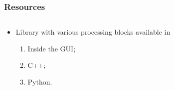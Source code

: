 \begin{frame}
	\frametitle{Resources}
    
\begin{columns}
        \begin{column}{0.5\textwidth}
     \begin{itemize}
    \item Library with various processing blocks available in
    \begin{enumerate}
     \item Inside the GUI;
     \item C++;
     \item Python.
    \end{enumerate}
     \end{itemize}
     
        \end{column}
        
        \begin{column}{0.5\textwidth}


\end{column}
\end{columns}
\end{frame}
